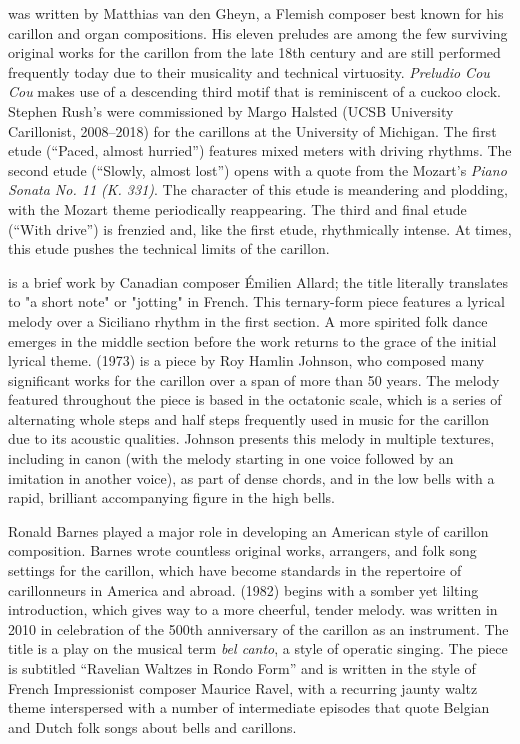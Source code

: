 \documentclass[11pt, letterpaper]{article}
\begin{document}
\begin{small}
     was written by Matthias van den Gheyn, a Flemish composer best known for his carillon and organ compositions. His eleven preludes are among the few surviving original works for the carillon from the late 18th century and are still performed frequently today due to their musicality and technical virtuosity. \textit{Preludio Cou Cou} makes use of a descending third motif that is reminiscent of a cuckoo clock. Stephen Rush's  were commissioned by Margo Halsted (UCSB University Carillonist, 2008--2018) for the carillons at the University of Michigan. The first etude (``Paced, almost hurried'') features mixed meters with driving rhythms. The second etude (``Slowly, almost lost'') opens with a quote from the Mozart's \textit{Piano Sonata No. 11 (K. 331)}. The character of this etude is meandering and plodding, with the Mozart theme periodically reappearing. The third and final etude (``With drive'') is frenzied and, like the first etude, rhythmically intense. At times, this etude pushes the technical limits of the carillon.

     is a brief work by Canadian composer Émilien Allard; the title literally translates to "a short note" or "jotting" in French. This ternary-form piece features a lyrical melody over a Siciliano rhythm in the first section. A more spirited folk dance emerges in the middle section before the work returns to the grace of the initial lyrical theme.  (1973) is a piece by Roy Hamlin Johnson, who composed many significant works for the carillon over a span of more than 50 years. The melody featured throughout the piece is based in the octatonic scale, which is a series of alternating whole steps and half steps frequently used in music for the carillon due to its acoustic qualities. Johnson presents this melody in multiple textures, including in canon (with the melody starting in one voice followed by an imitation in another voice), as part of dense chords, and in the low bells with a rapid, brilliant accompanying figure in the high bells.

    Ronald Barnes played a major role in developing an American style of carillon composition. Barnes wrote countless original works, arrangers, and folk song settings for the carillon, which have become standards in the repertoire of carillonneurs in America and abroad.  (1982) begins with a somber yet lilting introduction, which gives way to a more cheerful, tender melody.  was written in 2010 in celebration of the 500th anniversary of the carillon as an instrument. The title is a play on the musical term \textit{bel canto}, a style of operatic singing. The piece is subtitled ``Ravelian Waltzes in Rondo Form'' and is written in the style of French Impressionist composer Maurice Ravel, with a recurring jaunty waltz theme interspersed with a number of intermediate episodes that quote Belgian and Dutch folk songs about bells and carillons.


\end{small}
\end{document}
